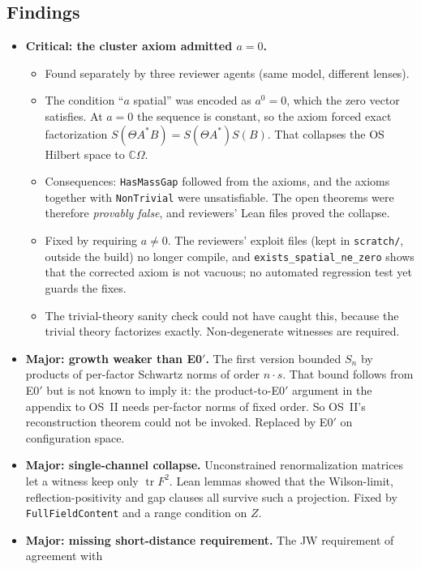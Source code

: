 \documentclass[11pt]{article}
\theoremstyle{definition}
\theoremstyle{remark}
\newcommand{\C}{\mathbb{C}}
\newcommand{\tr}{\operatorname{tr}}
\newcommand{\lean}[1]{\texttt{\hyphenchar\font=-1\relax #1}}
\begin{document}
\subsection{Findings}
\begin{itemize}[leftmargin=*]
\item \textbf{Critical: the cluster axiom admitted $a=0$.}
  \begin{itemize}
  \item Found separately by three reviewer agents (same model, different lenses).
  \item The condition ``$a$ spatial'' was encoded as $a^0=0$, which the zero vector satisfies.
    At $a=0$ the sequence is constant, so the axiom forced exact factorization
    $S(\Theta A^*B)=S(\Theta A^*)S(B)$. That collapses the OS Hilbert space to $\C\Omega$.
  \item Consequences: \lean{HasMassGap} followed from the axioms, and the axioms together with
    \lean{NonTrivial} were unsatisfiable. The open theorems were therefore \emph{provably false},
    and reviewers' Lean files proved the collapse.
  \item Fixed by requiring $a\neq0$. The reviewers' exploit files (kept in \lean{scratch/},
    outside the build) no longer compile, and \lean{exists\_spatial\_ne\_zero} shows that the
    corrected axiom is not vacuous; no automated regression test yet guards the fixes.
  \item The trivial-theory sanity check could not have caught this, because the trivial theory
    factorizes exactly. Non-degenerate witnesses are required.
  \end{itemize}
\item \textbf{Major: growth weaker than E0$'$.} The first version bounded $S_n$ by products of
  per-factor Schwartz norms of order $n\cdot s$. That bound follows from E0$'$ but is not known to
  imply it: the product-to-E0$'$ argument in the appendix to OS~II needs per-factor norms of fixed
  order. So OS~II's reconstruction theorem could not be invoked. Replaced by E0$'$ on configuration
  space.
\item \textbf{Major: single-channel collapse.} Unconstrained renormalization matrices let a
  witness keep only $\tr F^2$. Lean lemmas showed that the Wilson-limit, reflection-positivity
  and gap clauses all survive such a projection. Fixed by \lean{FullFieldContent} and a range
  condition on $Z$.
\item \textbf{Major: missing short-distance requirement.} The JW requirement of agreement with

\end{itemize}
\end{document}
